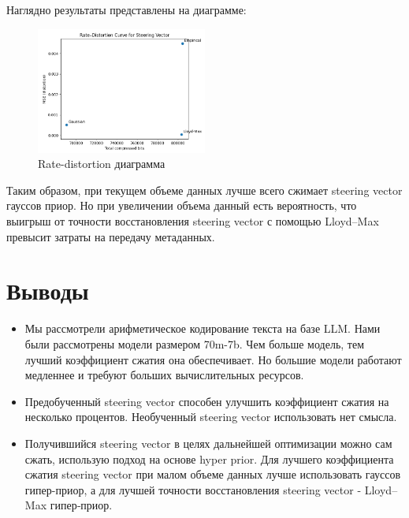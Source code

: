 \documentclass[a4paper,11pt]{article}
\begin{document}
Наглядно результаты представлены на диаграмме:
\begin{figure}[ht]
  \centering
  \includegraphics[width=0.5\textwidth]{Diagramm.png}
  \caption{Rate-distortion диаграмма}
  \label{fig:diagramm}
\end{figure}

Таким образом, при текущем объеме данных лучше всего сжимает steering vector гауссов приор. Но при увеличении объема данный есть вероятность, что выигрыш от точности восстановления steering vector с помощью Lloyd–Max превысит затраты на передачу метаданных.

\section*{Выводы}

\begin{itemize}
  \item Мы рассмотрели арифметическое кодирование текста на базе LLM. Нами были рассмотрены модели размером 70m-7b. Чем больше модель, тем лучший коэффициент сжатия она обеспечивает. Но большие модели работают медленнее и требуют больших вычислительных ресурсов.
  \item Предобученный steering vector способен улучшить коэффициент сжатия на несколько процентов. Необученный steering vector использовать нет смысла.
  \item Получившийся steering vector в целях дальнейшей оптимизации можно сам сжать, использую подход на основе hyper prior. Для лучшего коэффициента сжатия steering vector при малом объеме данных лучше использовать гауссов гипер-приор, а для лучшей точности восстановления steering vector - Lloyd–Max гипер‑приор.
\end{itemize}
\end{document}
